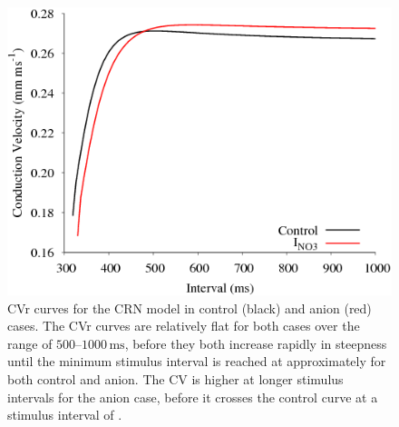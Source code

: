 \begin{figure}
\includegraphics{figures/toolkit/anion/06_CV}
\caption[Anion Sensitive Conduction Velocity Restitution]{
\label{anion:cvr} CVr curves for the CRN model in control (black) and anion
(red) cases. The CVr curves are relatively flat for both cases over the range of
$500\text{--}1000\,\text{ms}$, before they both increase rapidly in steepness until the minimum
stimulus interval is reached at approximately  for both control and anion.
The CV is higher at longer stimulus intervals for the anion case, before it
crosses the control curve at a stimulus interval of .}
\end{figure}


